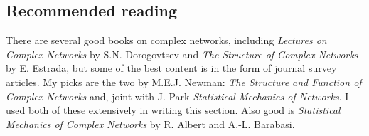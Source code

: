 \documentclass{article}
\begin{document}
\subsection{Recommended reading}

There are several good books on complex networks, including \emph{Lectures on Complex Networks} by S.N. Dorogovtsev and \emph{The Structure of Complex Networks} by E. Estrada, but some of the best content is in the form of journal survey articles. My picks are the two by M.E.J. Newman: \emph{The Structure and Function of Complex Networks} and, joint with J. Park \emph{Statistical Mechanics of Networks}. I used both of these extensively in writing this section. Also good is \emph{Statistical Mechanics of Complex Networks} by R. Albert and A.-L. Barabasi.
\end{document}
